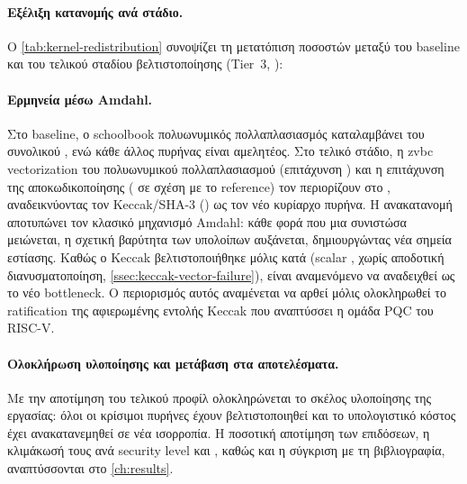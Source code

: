 \paragraph{Εξέλιξη κατανομής ανά στάδιο.}
Ο \cref{tab:kernel-redistribution} συνοψίζει τη μετατόπιση ποσοστών μεταξύ
του baseline και του τελικού σταδίου βελτιστοποίησης (Tier~3, ):
%
\begin{table}[htbp]
  \centering
  \caption{Εξέλιξη κατανομής \instret κατά πυρήνα (HQC-128).}
  \label{tab:kernel-redistribution}
  
\end{table}


\paragraph{Ερμηνεία μέσω Amdahl.}
Στο baseline, ο schoolbook πολυωνυμικός πολλαπλασιασμός καταλαμβάνει
 του συνολικού \instret, ενώ κάθε άλλος πυρήνας είναι αμελητέος.
Στο τελικό στάδιο, η \gls{zvbc} vectorization του πολυωνυμικού πολλαπλασιασμού
(επιτάχυνση ) και η επιτάχυνση της αποκωδικοποίησης
( σε σχέση με το reference) τον περιορίζουν στο ,
αναδεικνύοντας τον Keccak/SHA-3 () ως τον νέο κυρίαρχο πυρήνα. Η
ανακατανομή αποτυπώνει τον κλασικό μηχανισμό Amdahl: κάθε φορά που μια
συνιστώσα μειώνεται, η σχετική βαρύτητα των υπολοίπων αυξάνεται, δημιουργώντας
νέα σημεία εστίασης. Καθώς ο Keccak βελτιστοποιήθηκε μόλις κατά 
(scalar \Zbb, χωρίς αποδοτική διανυσματοποίηση, \cref{ssec:keccak-vector-failure}),
είναι αναμενόμενο να αναδειχθεί ως το νέο bottleneck. Ο περιορισμός αυτός
αναμένεται να αρθεί μόλις ολοκληρωθεί το ratification της αφιερωμένης εντολής
Keccak που αναπτύσσει η ομάδα PQC του RISC-V.

\paragraph{Ολοκλήρωση υλοποίησης και μετάβαση στα αποτελέσματα.}
Με την αποτίμηση του τελικού προφίλ ολοκληρώνεται το σκέλος υλοποίησης
της εργασίας: όλοι οι κρίσιμοι πυρήνες έχουν βελτιστοποιηθεί και το
υπολογιστικό κόστος έχει ανακατανεμηθεί σε νέα ισορροπία. Η
ποσοτική αποτίμηση των επιδόσεων, η κλιμάκωσή τους ανά
security level και \VLEN, καθώς και η σύγκριση με τη
βιβλιογραφία, αναπτύσσονται στο \cref{ch:results}.